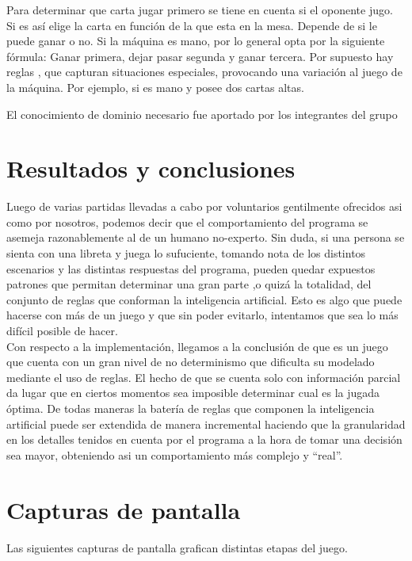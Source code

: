 \documentclass[12pt,a4paper]{article}
\begin{document}
Para determinar que carta jugar primero se tiene en cuenta si el oponente jugo. Si es as\'i elige la carta en 
funci\'on de la que esta en la mesa. Depende de si le puede ganar o no.
Si la m\'aquina es mano, por lo general opta por la siguiente f\'ormula: Ganar primera, dejar pasar segunda y ganar tercera. 
Por supuesto hay reglas , que capturan situaciones especiales, provocando una variaci\'on al juego de la m\'aquina. Por ejemplo, si es mano y posee dos cartas altas.


El conocimiento de dominio necesario fue aportado por los integrantes del grupo 

\section{Resultados y conclusiones}
Luego de varias partidas llevadas a cabo por voluntarios gentilmente ofrecidos asi como por nosotros,
podemos decir que el comportamiento del programa se asemeja razonablemente al de un humano no-experto. 
Sin duda, si una persona se sienta con una libreta y juega lo sufuciente, tomando nota de los distintos escenarios y las
distintas respuestas del programa, pueden quedar expuestos patrones que permitan determinar una gran parte
,o quiz\'a la totalidad, del conjunto de reglas que conforman la inteligencia artificial. Esto es algo
que puede hacerse con m\'as de un juego y que sin poder evitarlo, intentamos que sea lo m\'as dif\'icil
posible de hacer. \\
Con respecto a la implementaci\'on, llegamos a la conclusi\'on de que es un juego que cuenta con un 
gran nivel de no determinismo que dificulta su modelado mediante el uso de reglas. El hecho
de que se cuenta solo con informaci\'on parcial da lugar que en ciertos momentos sea imposible determinar 
cual es la jugada \'optima.
De todas maneras la bater\'ia de reglas que componen la inteligencia artificial puede ser extendida de 
manera incremental haciendo que la granularidad en los detalles tenidos en cuenta por el programa
a la hora de tomar una decisi\'on sea mayor, obteniendo asi un comportamiento m\'as complejo 
y ``real''.

\section{Capturas de pantalla}
Las siguientes capturas de pantalla grafican distintas etapas del juego.
\end{document}
